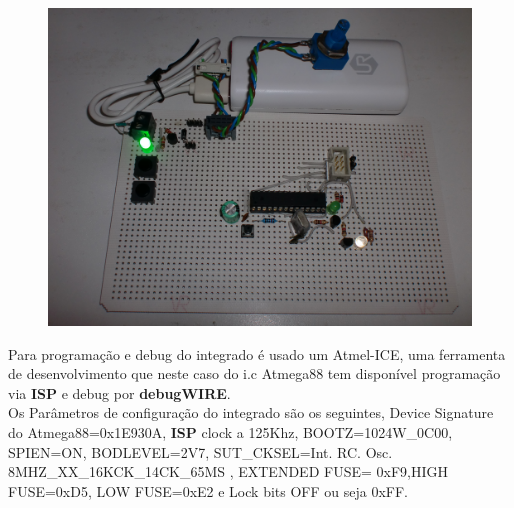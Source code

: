 \documentclass[titlepage, a4paper, 10pt, reqno, openany]{report}
\begin{document}
\begin{figure}[H]
	\centering
	\includegraphics[scale=0.05]{./image/Board/DevBoard_1.JPG}
\end{figure}
Para programa\c{c}\~{a}o e debug do integrado \'{e} usado um Atmel-ICE, uma ferramenta de desenvolvimento que neste caso do i.c Atmega88 tem dispon\'{i}vel programa\c{c}\~{a}o via {\bf ISP} e debug por {\bf debugWIRE}. \\
Os Par\^{a}metros de configura\c{c}\~{a}o do integrado s\~{a}o os seguintes, Device Signature do Atmega88=0x1E930A, {\bf ISP} clock a 125Khz, BOOTZ=1024W\_0C00, SPIEN=ON, BODLEVEL=2V7, SUT\_CKSEL=Int. RC. Osc. 8MHZ\_XX\_16KCK\_14CK\_65MS , EXTENDED FUSE= 0xF9,HIGH FUSE=0xD5, LOW FUSE=0xE2 e Lock bits OFF ou seja 0xFF.\\
\end{document}
